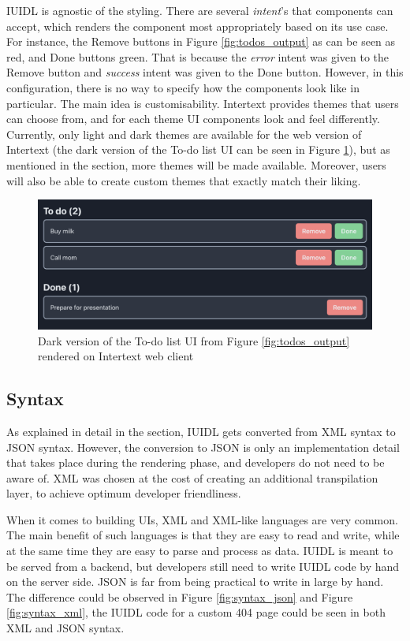 IUIDL is agnostic of the styling. There are several \textit{intent}'s that components can accept, which renders the component most appropriately based on its use case. For instance, the Remove buttons in Figure \ref{fig:todos_output} as can be seen as red, and Done buttons green. That is because the \textit{error} intent was given to the Remove button and \textit{success} intent was given to the Done button. However, in this configuration, there is no way to specify how the components look like in particular. The main idea is customisability. Intertext provides themes that users can choose from, and for each theme UI components look and feel differently. Currently, only light and dark themes are available for the web version of Intertext (the dark version of the To-do list UI can be seen in Figure \ref{fig:todos_output_dark}), but as mentioned in the  section, more themes will be made available. Moreover, users will also be able to create custom themes that exactly match their liking.

\begin{figure}
  \centering
  \includegraphics[width=13cm]{thesis/paper/images/todos_dark.png}
  \caption{Dark version of the To-do list UI from Figure \ref{fig:todos_output} rendered on Intertext web client}%
  \label{fig:todos_output_dark}%
\end{figure}

\subsection{Syntax}

As explained in detail in the  section, IUIDL gets converted from XML syntax to JSON syntax. However, the conversion to JSON is only an implementation detail that takes place during the rendering phase, and developers do not need to be aware of. XML was chosen at the cost of creating an additional transpilation layer, to achieve optimum developer friendliness. 

When it comes to building UIs, XML and XML-like languages are very common. The main benefit of such languages is that they are easy to read and write, while at the same time they are easy to parse and process as data. IUIDL is meant to be served from a backend, but developers still need to write IUIDL code by hand on the server side. JSON is far from being practical to write in large by hand. The difference could be observed in Figure \ref{fig:syntax_json} and Figure \ref{fig:syntax_xml}, the IUIDL code for a custom 404 page could be seen in both XML and JSON syntax.

